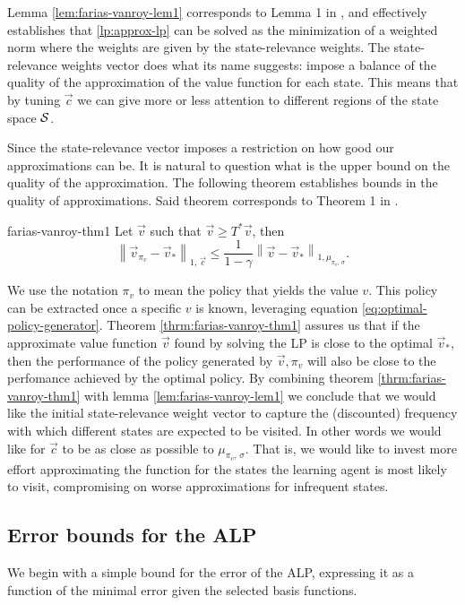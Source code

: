 Lemma \ref{lem:farias-vanroy-lem1} corresponds to Lemma 1 in
\Cite[pg.~853]{farias2003LP2ADP}, and effectively establishes that
\eqref{lp:approx-lp} can be solved as the minimization of a weighted norm where
the weights are given by the state-relevance weights. The state-relevance
weights vector does what its name suggests: impose a balance of the quality of
the approximation of the value function for each state. This means that by
tuning $\vec{c}$ we can give more or less attention to different regions of the
state space $\mathcal{S}$.

Since the state-relevance vector imposes a restriction on how good our
approximations can be. It is natural to question what is the upper bound on the
quality of the approximation. The following theorem establishes bounds in the
quality of approximations. Said theorem corresponds to Theorem 1 in
\Cite[pg.~853]{farias2003LP2ADP}.

\begin{thrm}{}{farias-vanroy-thm1}
    Let $\vec{v}$ such that $\vec{v} \geq T^{*} \vec{v}$, then
    \[
       \left\| \vec{v}_{\pi_v} - \vec{v}_* \right\|_{1,\, \vec{c}} \leq \frac{1}{1 - \gamma} \left\| \vec{v}  - \vec{v}_* \right\|_{1, \mu_{\pi_v, \, \sigma}}.
    \]
\end{thrm}

We use the notation $\pi_v$ to mean the policy that yields the value $v$. This
policy can be extracted once a specific $v$ is known, leveraging equation
\eqref{eq:optimal-policy-generator}. Theorem \ref{thrm:farias-vanroy-thm1}
assures us that if the approximate value function $\vec{v}$ found by solving the
LP is close to the optimal $\vec{v}_{*}$, then the performance of the policy
generated by $\vec{v}, \pi_v$  will also be close to the perfomance achieved by
the optimal policy. By combining theorem \ref{thrm:farias-vanroy-thm1} with
lemma \ref{lem:farias-vanroy-lem1} we conclude that we would like the initial
state-relevance weight vector to capture the (discounted) frequency with which
different states are expected to be visited. In other words we would like for
$\vec{c}$ to be as close as possible to $\mu_{\pi_v, \, \sigma}$. That is, we
would like to invest more effort approximating the function for the states the
learning agent is most likely to visit, compromising on worse approximations for
infrequent states.

\subsection{Error bounds for the ALP}
We begin with a simple bound for the error of the ALP, expressing it as a
function of the minimal error given the selected basis functions.

